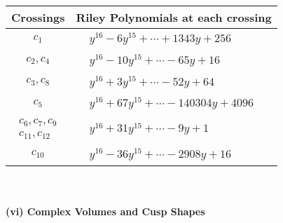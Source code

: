 \documentclass[1p]{elsarticle_modified}
\theoremstyle{definition}
\begin{document}
\begin{tabular}{m{50pt}|m{274pt}}
Crossings & \hspace{64pt}Riley Polynomials at each crossing \\
\hline $$\begin{aligned}c_{1}\end{aligned}$$&$\begin{aligned}
&y^{16}-6 y^{15}+\cdots+1343 y+256
\end{aligned}$\\
\hline $$\begin{aligned}c_{2},c_{4}\end{aligned}$$&$\begin{aligned}
&y^{16}-10 y^{15}+\cdots-65 y+16
\end{aligned}$\\
\hline $$\begin{aligned}c_{3},c_{8}\end{aligned}$$&$\begin{aligned}
&y^{16}+3 y^{15}+\cdots-52 y+64
\end{aligned}$\\
\hline $$\begin{aligned}c_{5}\end{aligned}$$&$\begin{aligned}
&y^{16}+67 y^{15}+\cdots-140304 y+4096
\end{aligned}$\\
\hline $$\begin{aligned}c_{6},c_{7},c_{9}\\c_{11},c_{12}\end{aligned}$$&$\begin{aligned}
&y^{16}+31 y^{15}+\cdots-9 y+1
\end{aligned}$\\
\hline $$\begin{aligned}c_{10}\end{aligned}$$&$\begin{aligned}
&y^{16}-36 y^{15}+\cdots-2908 y+16
\end{aligned}$\\
\hline
\end{tabular}\\~\\
\newpage\flushleft \textbf{(vi) Complex Volumes and Cusp Shapes}
\end{document}
